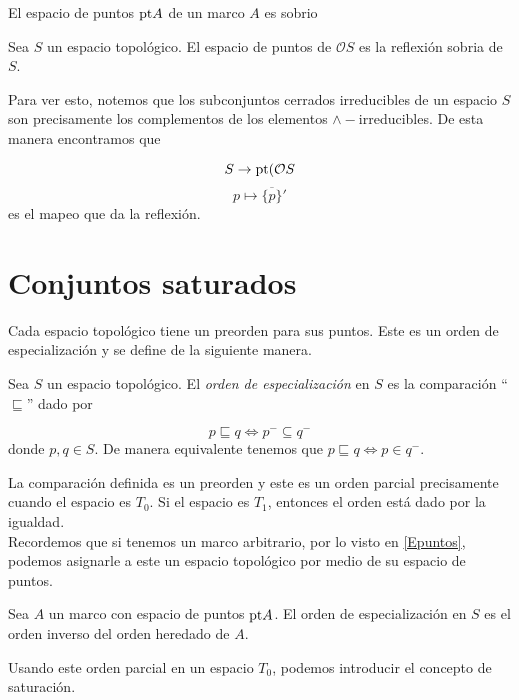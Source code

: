 \begin{lem}
    El espacio de puntos $\mathrm{pt} A$ de un marco $A$ es sobrio
\end{lem}

\begin{lem}
    Sea $S$ un espacio topológico. El espacio de puntos de $\mathcal{O}S$ es la reflexión sobria de $S$.
\end{lem}

Para ver esto, notemos que los subconjuntos cerrados irreducibles de un espacio $S$ son precisamente los complementos de los elementos $\wedge-$irreducibles. De esta manera encontramos que 

\[
S\to \mathrm{pt}(\mathcal{O}S
\]
\[
p\mapsto \overline{\{p\}}'
\]
es el mapeo que da la reflexión.

\section{Conjuntos saturados}\label{Conjuntos saturados}

Cada espacio topológico tiene un preorden para sus puntos. Este es un orden de especialización y se define de la siguiente manera.

\begin{dfn}\label{O. especializacion}
    Sea $S$ un espacio topológico. El \emph{orden de especialización} en $S$ es la comparación ``$\sqsubseteq$'' dado por 

    \[
    p\sqsubseteq q \Leftrightarrow p^- \subseteq q^-
    \]
    donde $p, q\in S$. De manera equivalente tenemos que $ p\sqsubseteq q \Leftrightarrow p\in q^-$.
\end{dfn}

La comparación definida es un preorden y este es un orden parcial precisamente cuando el espacio es $T_0$. Si el espacio es $T_1$, entonces el orden está dado por la igualdad.\\

Recordemos que si tenemos un marco arbitrario, por lo visto en \ref{Epuntos}, podemos asignarle a este un espacio topológico por medio de su espacio de puntos.

\begin{lem}
    Sea $A$ un marco con espacio de puntos $\mathrm{pt} A$. El orden de especialización en $S$ es el orden inverso del orden heredado de $A$.
\end{lem}

Usando este orden parcial en un espacio $T_0$, podemos introducir el concepto de saturación.

